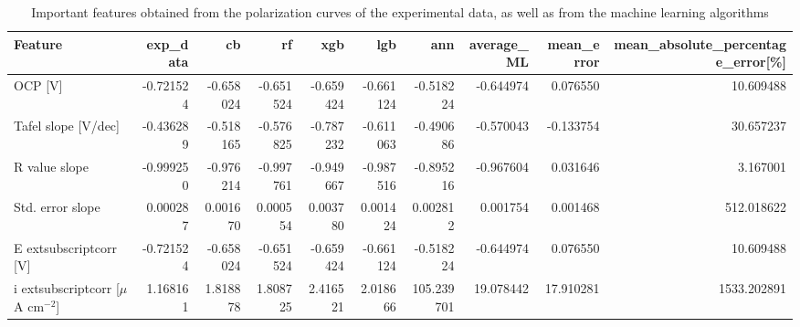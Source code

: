 \begin{table}[H]
\centering
\caption{Important features obtained from the polarization curves of the experimental data, as well as from the machine learning algorithms}
\label{imp_feat_ph_3.6}
\begin{tabular}{lrrrrrrrrr}
\toprule
Feature & exp_data & cb & rf & xgb & lgb & ann & average_ML & mean_error & mean_absolute_percentage_error[\%] \\
\midrule
OCP [V] & -0.721524 & -0.658024 & -0.651524 & -0.659424 & -0.661124 & -0.518224 & -0.644974 & 0.076550 & 10.609488 \\
Tafel slope [V/dec] & -0.436289 & -0.518165 & -0.576825 & -0.787232 & -0.611063 & -0.490686 & -0.570043 & -0.133754 & 30.657237 \\
R value slope & -0.999250 & -0.976214 & -0.997761 & -0.949667 & -0.987516 & -0.895216 & -0.967604 & 0.031646 & 3.167001 \\
Std. error slope & 0.000287 & 0.001670 & 0.000554 & 0.003780 & 0.001424 & 0.002812 & 0.001754 & 0.001468 & 512.018622 \\
E	extsubscript{corr} [V] & -0.721524 & -0.658024 & -0.651524 & -0.659424 & -0.661124 & -0.518224 & -0.644974 & 0.076550 & 10.609488 \\
i	extsubscript{corr} [$\mu$A cm$^{-2}$] & 1.168161 & 1.818878 & 1.808725 & 2.416521 & 2.018666 & 105.239701 & 19.078442 & 17.910281 & 1533.202891 \\
\bottomrule
\end{tabular}
\end{table}
